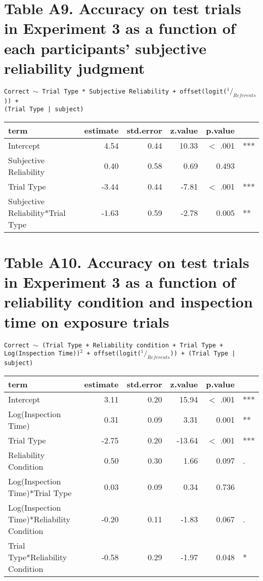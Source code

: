 \documentclass[oneside]{report}
\begin{document}
\section*{Table A9. Accuracy on test trials in Experiment 3 as a function of each participants' subjective reliability judgment}

\texttt{Correct $\sim$ Trial Type * Subjective Reliability + offset(logit($^1/_{Referents}$)) + \\ (Trial Type | subject)}
\begin{table}[h]
\centering
\begin{tabular}{lrrrrl}
 term & estimate & std.error & z.value & p.value &  \\ 
  \hline
Intercept & 4.54 & 0.44 & 10.33 & $<$ .001 & *** \\ 
  Subjective Reliability & 0.40 & 0.58 & 0.69 & 0.493 &  \\ 
  Trial Type & -3.44 & 0.44 & -7.81 & $<$ .001 & *** \\ 
  Subjective Reliability*Trial Type & -1.63 & 0.59 & -2.78 & 0.005 & ** \\ 
   \hline
\end{tabular}
\label{tab:e3_acc_subj_rel}
\end{table}
\section*{Table A10. Accuracy on test trials in Experiment 3 as a function of reliability condition and inspection time on exposure trials}

\texttt{Correct $\sim$ (Trial Type + Reliability condition + Trial Type + \\ Log(Inspection Time))$^2$ + offset(logit($^1/_{Referents}$)) + (Trial Type | subject)}
\begin{table}[h]
\centering
\begin{tabular}{lrrrrl}
 term & estimate & std.error & z.value & p.value &  \\ 
  \hline
Intercept & 3.11 & 0.20 & 15.94 & $<$ .001 & *** \\ 
  Log(Inspection Time) & 0.31 & 0.09 & 3.31 & 0.001 & ** \\ 
  Trial Type & -2.75 & 0.20 & -13.64 & $<$ .001 & *** \\ 
  Reliability Condition & 0.50 & 0.30 & 1.66 & 0.097 & . \\ 
  Log(Inspection Time)*Trial Type & 0.03 & 0.09 & 0.34 & 0.736 &  \\ 
  Log(Inspection Time)*Reliability Condition & -0.20 & 0.11 & -1.83 & 0.067 & . \\ 
  Trial Type*Reliability Condition & -0.58 & 0.29 & -1.97 & 0.048 & * \\ 
   \hline
\end{tabular}
\label{tab:e3_acc_inspect}
\end{table}
\newpage
\end{document}
